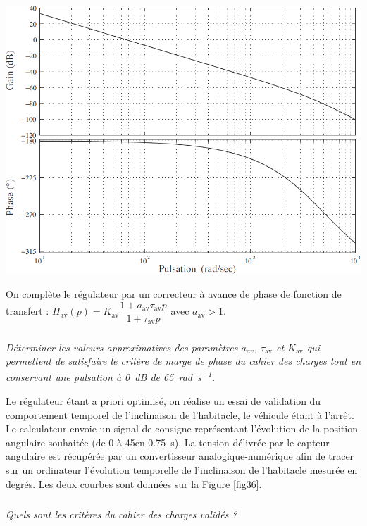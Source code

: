 \begin{multicols}{2}
\begin{multicols}{2}
\begin{center}
\includegraphics[width=\linewidth]{images/pt_35}
\end{center}

On complète le régulateur par un correcteur à avance de phase de fonction de transfert : $H_{\text{av}}(p)=K_{\text{av}}\dfrac{1+a_{\text{av}}\tau_{\text{av}}p}{1+\tau_{\text{av}}p}$ avec $a_{\text{av}}>1$.

\subparagraph{}
\textit{Déterminer les valeurs approximatives des paramètres $a_{av}$, $\tau_{\text{av}}$ et $K_{\text{av}}$ qui permettent de satisfaire le critère de marge de phase du cahier des charges tout en conservant une pulsation à \SI{0}{dB} de \SI{65}{rad.s^{-1}}.}
\ifprof
\begin{corrige}
\end{corrige}
\else
\fi


Le régulateur étant a priori optimisé, on réalise un essai de validation du comportement temporel de l'inclinaison de l'habitacle, le véhicule étant à l'arrêt. Le calculateur envoie un signal de consigne représentant l'évolution de la position angulaire souhaitée (de 0 à 45\degres en \SI{0,75}{s}). La tension délivrée par le capteur angulaire est récupérée par un convertisseur analogique-numérique afin de tracer sur un ordinateur l'évolution temporelle de l'inclinaison de l'habitacle mesurée en degrés. Les deux courbes sont données sur la Figure \ref{fig36}.

\subparagraph{}
\textit{Quels sont les critères du cahier des charges validés ?}
\ifprof
\begin{corrige}
\end{corrige}
\else
\fi



\end{multicols}
\end{multicols}
